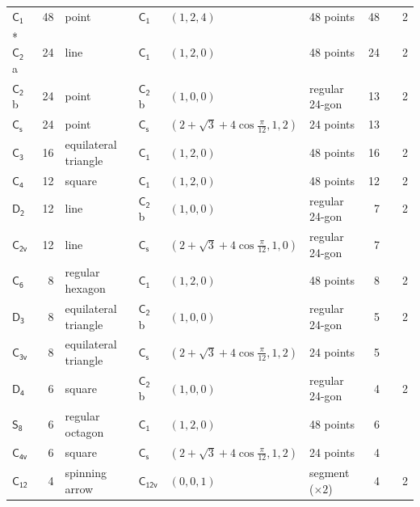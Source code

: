 \documentclass[10pt,a4paper]{article}
\numberwithin{equation}{section}
\newcommand{\grp}[1]{\mathsf{#1}}
\newcommand{\clsletter}[1]{\,{\scriptsize\color{black!55}#1}}
\newlength{\fillwidth}\newlength{\cellwidth}\newlength{\colwidth}
\begin{document}
{{\begin{longtable}{@{}lrllllr>{\RaggedRight\arraybackslash}p{\fillwidth}r@{}}
\href{C1.pdf}{$\grp{C_{1}}$} & 48 & point & \href{C1.pdf}{$\grp{C_{1}}$} & $(1, 2, 4)$ & 48 points & 48 &  & 2\\*
\href{C2.pdf}{$\grp{C_{2}}$}\clsletter{a} & 24 & line & \href{C1.pdf}{$\grp{C_{1}}$} & $(1, 2, 0)$ & 48 points & 24 &  & 2\\
\href{C2.pdf}{$\grp{C_{2}}$}\clsletter{b} & 24 & point & \href{C2.pdf}{$\grp{C_{2}}$}\clsletter{b} & $(1, 0, 0)$ & regular 24-gon & 13 &  & 2\\
\href{C1v.pdf}{$\grp{C_{s}}$} & 24 & point & \href{C1v.pdf}{$\grp{C_{s}}$} & $(2 + \sqrt{3} + 4\cos\tfrac{\pi}{12}, 1, 2)$ & 24 points & 13 &  & \\
\href{C3.pdf}{$\grp{C_{3}}$} & 16 & equilateral triangle & \href{C1.pdf}{$\grp{C_{1}}$} & $(1, 2, 0)$ & 48 points & 16 &  & 2\\
\href{C4.pdf}{$\grp{C_{4}}$} & 12 & square & \href{C1.pdf}{$\grp{C_{1}}$} & $(1, 2, 0)$ & 48 points & 12 &  & 2\\
\href{D2.pdf}{$\grp{D_{2}}$} & 12 & line & \href{C2.pdf}{$\grp{C_{2}}$}\clsletter{b} & $(1, 0, 0)$ & regular 24-gon & 7 &  & 2\\
\href{C2v.pdf}{$\grp{C_{2v}}$} & 12 & line & \href{C1v.pdf}{$\grp{C_{s}}$} & $(2 + \sqrt{3} + 4\cos\tfrac{\pi}{12}, 1, 0)$ & regular 24-gon & 7 &  & \\
\href{C6.pdf}{$\grp{C_{6}}$} & 8 & regular hexagon & \href{C1.pdf}{$\grp{C_{1}}$} & $(1, 2, 0)$ & 48 points & 8 &  & 2\\
\href{D3.pdf}{$\grp{D_{3}}$} & 8 & equilateral triangle & \href{C2.pdf}{$\grp{C_{2}}$}\clsletter{b} & $(1, 0, 0)$ & regular 24-gon & 5 &  & 2\\
\href{C3v.pdf}{$\grp{C_{3v}}$} & 8 & equilateral triangle & \href{C1v.pdf}{$\grp{C_{s}}$} & $(2 + \sqrt{3} + 4\cos\tfrac{\pi}{12}, 1, 2)$ & 24 points & 5 &  & \\
\href{D4.pdf}{$\grp{D_{4}}$} & 6 & square & \href{C2.pdf}{$\grp{C_{2}}$}\clsletter{b} & $(1, 0, 0)$ & regular 24-gon & 4 &  & 2\\
\href{S8.pdf}{$\grp{S_{8}}$} & 6 & regular octagon & \href{C1.pdf}{$\grp{C_{1}}$} & $(1, 2, 0)$ & 48 points & 6 &  & \\
\href{C4v.pdf}{$\grp{C_{4v}}$} & 6 & square & \href{C1v.pdf}{$\grp{C_{s}}$} & $(2 + \sqrt{3} + 4\cos\tfrac{\pi}{12}, 1, 2)$ & 24 points & 4 &  & \\
\href{C12.pdf}{$\grp{C_{12}}$} & 4 & spinning arrow & \href{C12v.pdf}{$\grp{C_{12v}}$} & $(0, 0, 1)$ & segment (${\times}2$) & 4 &  & 2\\

\end{longtable}}}
\end{document}
